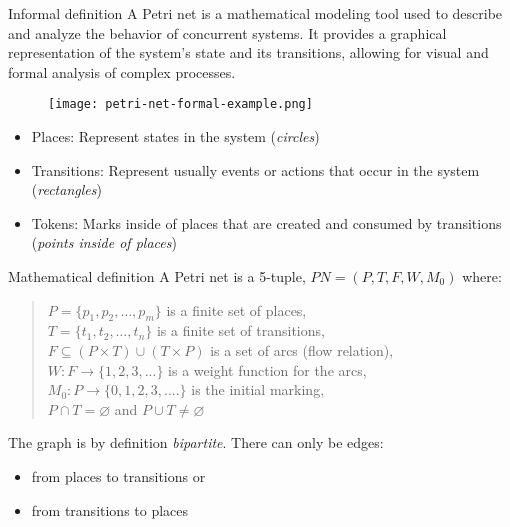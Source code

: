 \documentclass{beamer}
\begin{document}
\begin{frame}{Informal definition}
  A Petri net is a mathematical modeling tool
  used to describe and analyze the behavior of concurrent systems.
  It provides a graphical representation of the system's state and its transitions,
  allowing for visual and formal analysis of complex processes.
  
  \begin{figure}[!htb]
    \centering
    \texttt{[image: petri-net-formal-example.png]}
  \end{figure}

  \scriptsize
  \begin{itemize}
    \item Places: Represent states in the system (\emph{circles})
    \item Transitions: Represent usually events or actions that occur in the system (\emph{rectangles})
    \item Tokens: Marks inside of places that are created
          and consumed by transitions (\emph{points inside of places})
  \end{itemize}
  
  \vfill
\end{frame}

\begin{frame}{Mathematical definition}
  A Petri net is a 5-tuple, $ PN = (P, T, F, W, M_{0}) $ where:

  \begin{quote}
        $ P = \{ p_1, p_2, \dots, p_m \} $ is a finite set of places,\\
        $ T = \{ t_1, t_2, \dots, t_n \} $ is a finite set of transitions,\\
        $ F \subseteq (P \times T) \cup (T \times P) $ is a set of arcs (flow relation),\\
        $ W: F \rightarrow \{1, 2, 3, ... \} $ is a weight function for the arcs,\\
        $ M_{0}: P \rightarrow \{0, 1, 2, 3, .... \} $ is the initial marking,\\
        $ P \cap T = \varnothing $ and $ P \cup T \neq \varnothing $
  \end{quote}

  The graph is by definition \emph{bipartite}.
  There can only be edges:
  \begin{itemize}
    \item from places to transitions or
    \item from transitions to places
  \end{itemize}

\end{frame}
\end{document}
